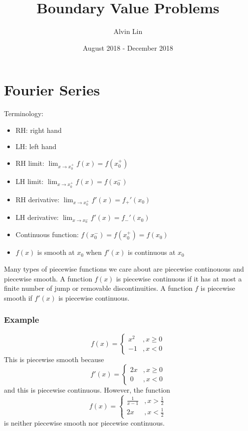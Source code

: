 \documentclass{math}
\title{Boundary Value Problems}
\author{Alvin Lin}
\date{August 2018 - December 2018}
\begin{document}
\maketitle

\section*{Fourier Series}
Terminology:
\begin{itemize}
  \item RH: right hand
  \item LH: left hand
  \item RH limit: \( \lim_{x\to x_0^+}f(x) = f(x_0^+) \)
  \item LH limit: \( \lim_{x\to x_0^+}f(x) = f(x_0^-) \)
  \item RH derivative: \( \lim_{x\to x_0^+}f'(x) = f_+'(x_0) \)
  \item LH derivative: \( \lim_{x\to x_0^-}f'(x) = f_-'(x_0) \)
  \item Continuous function: \( f(x_0^-) = f(x_0^+) = f(x_0) \)
  \item \( f(x) \) is smooth at \( x_0 \) when \( f'(x) \) is continuous at
    \( x_0 \)
\end{itemize}
Many types of piecewise functions we care about are piecewise continouous and
piecewise smooth. A function \( f(x) \) is piecewise continuous if it has at
most a finite number of jump or removable discontinuities. A function \( f \) is
piecewise smooth if \( f'(x) \) is piecewise continuous.

\subsubsection*{Example}
\[ f(x) = \begin{cases}
  x^2 &, x\ge0 \\
  -1 &, x<0
\end{cases} \]
This is piecewise smooth because
\[ f'(x) = \begin{cases}
  2x &, x\ge0 \\
  0 &, x<0
\end{cases} \]
and this is piecewise continuous. However, the function
\[ f(x) = \begin{cases}
  \frac{1}{x-1} &, x>\frac{1}{2} \\
  2x &, x<\frac{1}{2}
\end{cases} \]
is neither piecewise smooth nor piecewise continuous.
\end{document}
